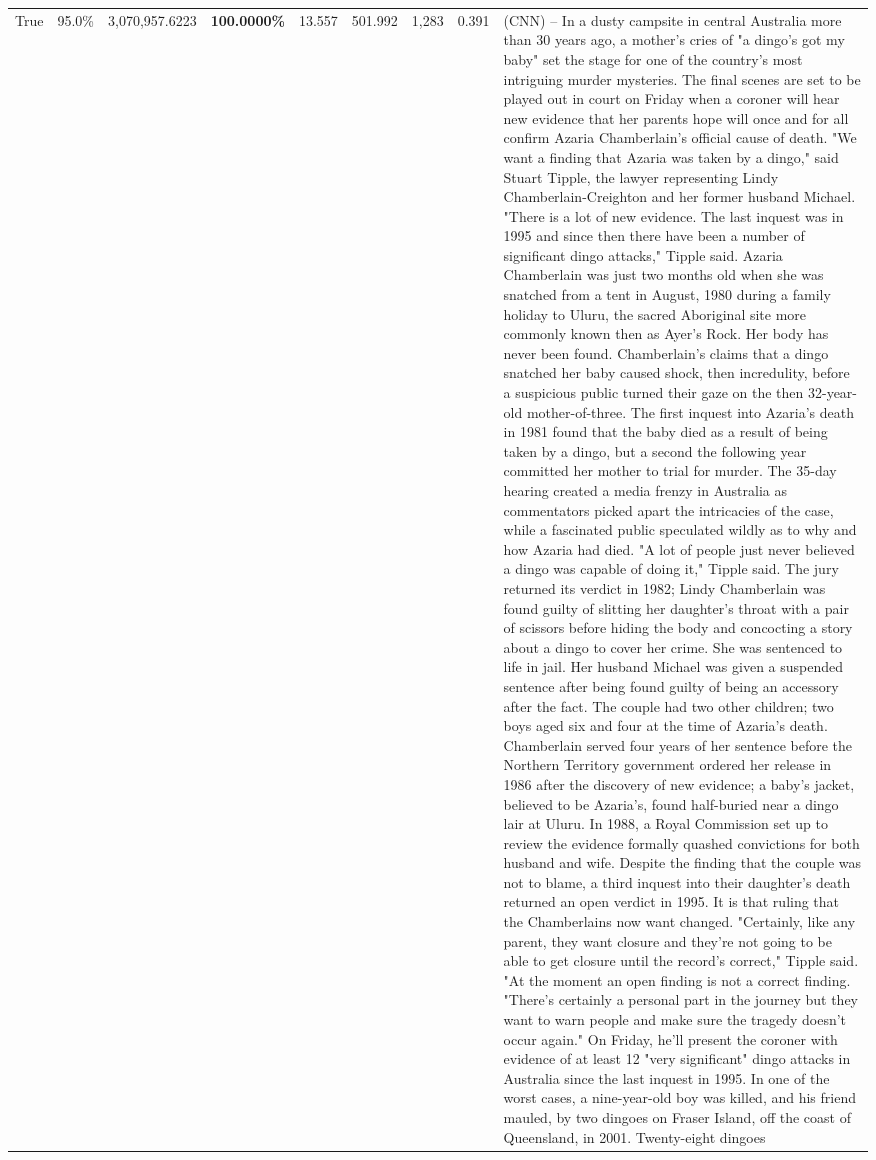 \begin{table}[H]
\begin{tabular}{lllrlllll}
True & 95.0\% & 3,070,957.6223 & \bfseries \color{red} 100.0000\% & 13.557 & 501.992 & 1,283 & 0.391 & (CNN) -- In a dusty campsite in central Australia more than 30 years ago, a mother's cries of "a dingo's got my baby" set the stage for one of the country's most intriguing murder mysteries. The final scenes are set to be played out in court on Friday when a coroner will hear new evidence that her parents hope will once and for all confirm Azaria Chamberlain's official cause of death. "We want a finding that Azaria was taken by a dingo," said Stuart Tipple, the lawyer representing Lindy Chamberlain-Creighton and her former husband Michael. "There is a lot of new evidence. The last inquest was in 1995 and since then there have been a number of significant dingo attacks," Tipple said. Azaria Chamberlain was just two months old when she was snatched from a tent in August, 1980 during a family holiday to Uluru, the sacred Aboriginal site more commonly known then as Ayer's Rock. Her body has never been found. Chamberlain's claims that a dingo snatched her baby caused shock, then incredulity, before a suspicious public turned their gaze on the then 32-year-old mother-of-three. The first inquest into Azaria's death in 1981 found that the baby died as a result of being taken by a dingo, but a second the following year committed her mother to trial for murder. The 35-day hearing created a media frenzy in Australia as commentators picked apart the intricacies of the case, while a fascinated public speculated wildly as to why and how Azaria had died. "A lot of people just never believed a dingo was capable of doing it," Tipple said. The jury returned its verdict in 1982; Lindy Chamberlain was found guilty of slitting her daughter's throat with a pair of scissors before hiding the body and concocting a story about a dingo to cover her crime. She was sentenced to life in jail. Her husband Michael was given a suspended sentence after being found guilty of being an accessory after the fact. The couple had two other children; two boys aged six and four at the time of Azaria's death. Chamberlain served four years of her sentence before the Northern Territory government ordered her release in 1986 after the discovery of new evidence; a baby's jacket, believed to be Azaria's, found half-buried near a dingo lair at Uluru. In 1988, a Royal Commission set up to review the evidence formally quashed convictions for both husband and wife. Despite the finding that the couple was not to blame, a third inquest into their daughter's death returned an open verdict in 1995. It is that ruling that the Chamberlains now want changed. "Certainly, like any parent, they want closure and they're not going to be able to get closure until the record's correct," Tipple said. "At the moment an open finding is not a correct finding. "There's certainly a personal part in the journey but they want to warn people and make sure the tragedy doesn't occur again." On Friday, he'll present the coroner with evidence of at least 12 "very significant" dingo attacks in Australia since the last inquest in 1995. In one of the worst cases, a nine-year-old boy was killed, and his friend mauled, by two dingoes on Fraser Island, off the coast of Queensland, in 2001. Twenty-eight dingoes 
\end{tabular}
\end{table}
